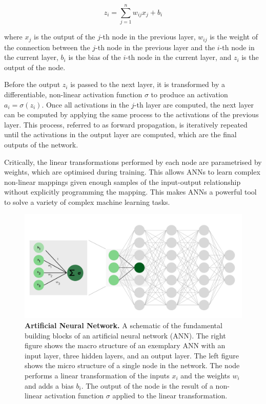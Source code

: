 \documentclass[a4paper]{article}
\begin{document}
\begin{equation}
  z_{i} = \sum_{j=1}^{n} w_{ij} x_j + b_i
  \label{eq:perceptron}
\end{equation}

where $x_j$ is the output of the $j$-th node in the previous layer, $w_{ij}$ is
the weight of the connection between the $j$-th node in the previous layer and
the $i$-th node in the current layer, $b_i$ is the bias of the $i$-th node in
the current layer, and $z_i$ is the output of the node.

Before the output $z_i$ is passed to the next layer, it is transformed by a
differentiable, non-linear activation function $\sigma$ to produce an activation
$a_i = \sigma(z_i)$. Once all activations in the $j$-th layer are computed, the
next layer can be computed by applying the same process to the activations of
the previous layer. This process, referred to as forward propagation, is
iteratively repeated until the activations in the output layer are computed,
which are the final outputs of the network.

Critically, the linear transformations performed by each node are parametrised
by weights, which are optimised during training. This allows ANNs to learn
complex non-linear mappings given enough samples of the input-output
relationship without explicitly programming the mapping. This makes ANNs a
powerful tool to solve a variety of complex machine learning tasks.

\begin{figure}
  \begin{center}
    \includegraphics[width=\textwidth]{./figures/ann.png}
  \end{center}

  \caption{\textbf{Artificial Neural Network.} A schematic of the fundamental
    building blocks of an artificial neural network (ANN). The right figure
    shows the macro structure of an exemplary ANN with an input layer, three
    hidden layers, and an output layer. The left figure shows the micro
    structure of a single node in the network. The node performs a linear
    transformation of the inputs $x_i$ and the weights $w_i$ and adds a bias
    $b_i$. The output of the node is the result of a non-linear activation
    function $\sigma$ applied to the linear transformation.}
  \label{fig:ann}
\end{figure}
\end{document}
